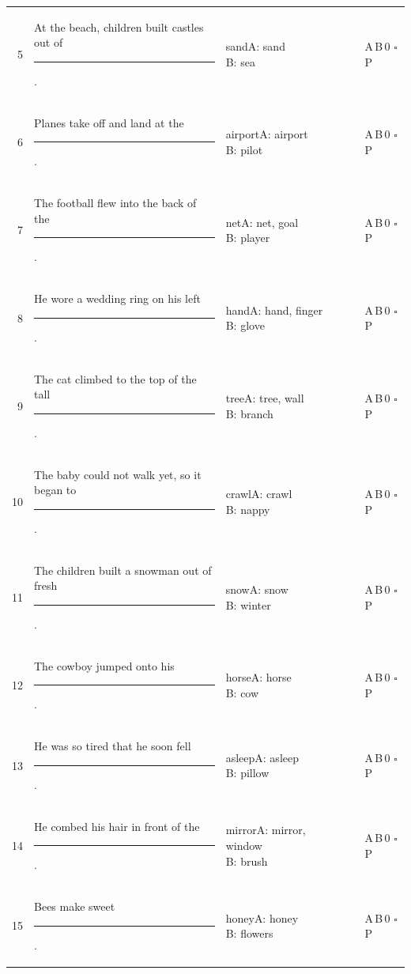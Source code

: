 \documentclass[10pt,a4paper]{article}
\newcommand{\blank}[1][1.2cm]{\rule{#1}{0.4pt}}
\newcommand{\bx}{$\square$}
\begin{document}
{\begin{longtable}{@{}r>{\raggedright\arraybackslash}p{7.2cm}>{\raggedright\arraybackslash}p{1.9cm}p{2.4cm}p{1.1cm}l@{}}
5 & At the beach, children built castles out of \rule{1.1cm}{0.4pt}. & sand\newline{\scriptsize A: sand\newline B: sea} & \blank[2.2cm] & \blank[0.9cm] & A\,B\,0 \bx P\\
6 & Planes take off and land at the \rule{1.1cm}{0.4pt}. & airport\newline{\scriptsize A: airport\newline B: pilot} & \blank[2.2cm] & \blank[0.9cm] & A\,B\,0 \bx P\\
7 & The football flew into the back of the \rule{1.1cm}{0.4pt}. & net\newline{\scriptsize A: net, goal\newline B: player} & \blank[2.2cm] & \blank[0.9cm] & A\,B\,0 \bx P\\
8 & He wore a wedding ring on his left \rule{1.1cm}{0.4pt}. & hand\newline{\scriptsize A: hand, finger\newline B: glove} & \blank[2.2cm] & \blank[0.9cm] & A\,B\,0 \bx P\\
9 & The cat climbed to the top of the tall \rule{1.1cm}{0.4pt}. & tree\newline{\scriptsize A: tree, wall\newline B: branch} & \blank[2.2cm] & \blank[0.9cm] & A\,B\,0 \bx P\\
10 & The baby could not walk yet, so it began to \rule{1.1cm}{0.4pt}. & crawl\newline{\scriptsize A: crawl\newline B: nappy} & \blank[2.2cm] & \blank[0.9cm] & A\,B\,0 \bx P\\
11 & The children built a snowman out of fresh \rule{1.1cm}{0.4pt}. & snow\newline{\scriptsize A: snow\newline B: winter} & \blank[2.2cm] & \blank[0.9cm] & A\,B\,0 \bx P\\
12 & The cowboy jumped onto his \rule{1.1cm}{0.4pt}. & horse\newline{\scriptsize A: horse\newline B: cow} & \blank[2.2cm] & \blank[0.9cm] & A\,B\,0 \bx P\\
13 & He was so tired that he soon fell \rule{1.1cm}{0.4pt}. & asleep\newline{\scriptsize A: asleep\newline B: pillow} & \blank[2.2cm] & \blank[0.9cm] & A\,B\,0 \bx P\\
14 & He combed his hair in front of the \rule{1.1cm}{0.4pt}. & mirror\newline{\scriptsize A: mirror, window\newline B: brush} & \blank[2.2cm] & \blank[0.9cm] & A\,B\,0 \bx P\\
15 & Bees make sweet \rule{1.1cm}{0.4pt}. & honey\newline{\scriptsize A: honey\newline B: flowers} & \blank[2.2cm] & \blank[0.9cm] & A\,B\,0 \bx P\\
\bottomrule\end{longtable}}
\end{document}
